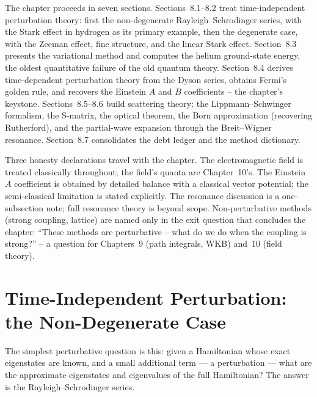 The chapter proceeds in seven sections. Sections~8.1--8.2 treat time-independent perturbation theory: first the non-degenerate Rayleigh--Schrodinger series, with the Stark effect in hydrogen as its primary example, then the degenerate case, with the Zeeman effect, fine structure, and the linear Stark effect. Section~8.3 presents the variational method and computes the helium ground-state energy, the oldest quantitative failure of the old quantum theory. Section~8.4 derives time-dependent perturbation theory from the Dyson series, obtains Fermi's golden rule, and recovers the Einstein $A$ and $B$ coefficients -- the chapter's keystone. Sections~8.5--8.6 build scattering theory: the Lippmann--Schwinger formalism, the S-matrix, the optical theorem, the Born approximation (recovering Rutherford), and the partial-wave expansion through the Breit--Wigner resonance. Section~8.7 consolidates the debt ledger and the method dictionary.

Three honesty declarations travel with the chapter. The electromagnetic field is treated classically throughout; the field's quanta are Chapter~10's. The Einstein $A$ coefficient is obtained by detailed balance with a classical vector potential; the semi-classical limitation is stated explicitly. The resonance discussion is a one-subsection note; full resonance theory is beyond scope. Non-perturbative methods (strong coupling, lattice) are named only in the exit question that concludes the chapter: ``These methods are perturbative -- what do we do when the coupling is strong?'' -- a question for Chapters~9 (path integrals, WKB) and~10 (field theory).

\section{Time-Independent Perturbation: the Non-Degenerate Case}
\label{sec:tipt-nondegenerate}

The simplest perturbative question is this: given a Hamiltonian whose exact eigenstates are known, and a small additional term --- a perturbation --- what are the approximate eigenstates and eigenvalues of the full Hamiltonian? The answer is the Rayleigh--Schrodinger series.

